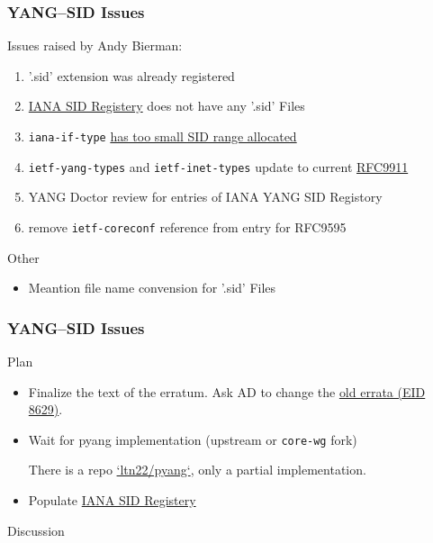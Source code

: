 \documentclass{beamer}
\begin{document}
\begin{frame}[fragile]
	\frametitle{YANG--SID Issues}
	
	Issues raised by Andy Bierman:
	\begin{enumerate}
		\item '.sid' extension was already registered
		\item \href{https://www.iana.org/assignments/yang-sid/yang-sid.xhtml#ietf-yang-sid-modules}{IANA SID Registery} does not have any '.sid' Files
		\item \verb|iana-if-type| \href{https://mailarchive.ietf.org/arch/msg/yang-tooling/Sr-AMBFO-WBoHcIog7iaMDqS2I4/}{has too small SID range allocated}
		\item \verb|ietf-yang-types| and \verb|ietf-inet-types| update to current \href{https://datatracker.ietf.org/doc/html/rfc9911}{RFC9911}
		\item YANG Doctor review for entries of IANA YANG SID Registory
		\item remove \verb|ietf-coreconf| reference from entry for RFC9595
	\end{enumerate}

	\begin{block}{Other}
	\begin{itemize}
	      \item Meantion file name convension for '.sid' Files
	\end{itemize}
	\end{block}

\end{frame}


\begin{frame}[fragile]
	\frametitle{YANG--SID Issues}
	
	\begin{block}{Plan}
	
		\begin{itemize}
			\item Finalize the text of the erratum. Ask AD to change the \href{https://www.rfc-editor.org/errata/eid8629}{old errata (EID 8629)}.
			\item Wait for pyang implementation (upstream or \verb|core-wg| fork)
			
			There is a repo \href{https://github.com/ltn22/pyang}{`ltn22/pyang`}, only a partial implementation.
			\item Populate \href{https://www.iana.org/assignments/yang-sid/yang-sid.xhtml#ietf-yang-sid-modules}{IANA SID Registery}
		\end{itemize}
	\end{block}
	
	\begin{block}{Discussion}
	\end{block}
	
\end{frame}
\end{document}
